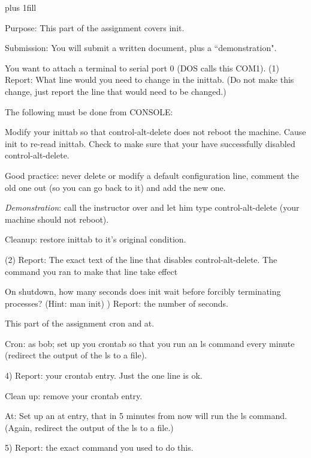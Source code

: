 
\rightskip=0pt plus 1fill

\parindent 0pt

Purpose: This part of the assignment covers init.

Submission: You will submit a written document, plus a ``demonstration".

You want to attach a terminal to serial port 0 (DOS calls this COM1).
(1) Report: What line would you need to change in the inittab.
(Do not make this change, just report the line that would need
to be changed.)

The following must be done from CONSOLE:

Modify your {\ltt{}inittab} so that control-alt-delete does not
reboot the machine.
Cause {\ltt{}init} to re-read {\ltt{}inittab}.
Check to make sure that your have successfully disabled control-alt-delete.

Good practice: never delete or modify a default configuration line, 
comment the old one out (so you can go back to it) and add the new one.

{\it Demonstration}: 
call the instructor over and let him type control-alt-delete
(your machine should not reboot).

Cleanup: restore {\ltt{}inittab} to it's original condition. 

(2) Report: The exact text of the line that disables control-alt-delete.
The command you ran to make that line take effect

On shutdown, how many seconds does {\ltt{}init} wait before 
forcibly terminating processes? (Hint: {\ltt{}man init})
) Report: the number of seconds.

This part of the assignment cron and at.

Cron: as bob; set up you crontab so that you run an {\ltt{}ls} command
every minute (redirect the output of the {\ltt{}ls} to a file). 

4) Report: your crontab entry. Just the one line is ok.

Clean up: remove your crontab entry.

At: Set up an at entry, that in 5 minutes from now will
run the {\ltt{}ls} command.
(Again, redirect the output of the {\ltt{}ls} to a file.) 

5) Report: the exact command you used to do this.

\bye
